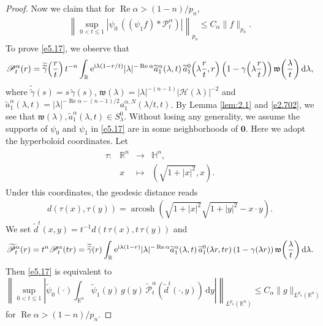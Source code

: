 \documentclass[11pt]{amsproc}
\newcommand{\R}{\mathbb{R}}
\newcommand{\e}{\mathrm{e}}
\newcommand{\arcosh}{\mathop{\mathrm{arcosh}}}
\newcommand{\0}{\mathbf{0}}
\newcommand{\bc}{{ \mathcal{H} }}
\newcommand{\fc}{\mathfrak{w}}
\renewcommand{\Re}{\mathop{\mathrm{Re}}}
\renewcommand{\H}{\mathbb{H}}
\renewcommand{\i}{\mathrm{i}}
\renewcommand{\d}{\mathrm{d}}
\numberwithin{equation}{section}
\numberwithin{figure}{section}
\theoremstyle{definition}
\theoremstyle{remark}
\numberwithin{thm}{section}
\begin{document}
\begin{proof}
Now we claim that for $ \Re\alpha>{(1-n)/p_n}$,
\begin{eqnarray}\label{e5.17}
\left\|\sup_{0<t\leq 1}|\psi_0\,((\psi_1f)*\mathscr{P}^\alpha_t)|\right\|_{p_n}\leq C_\alpha \|f\|_{p_n}.
\end{eqnarray}
To prove \eqref{e5.17}, we observe that 
\begin{eqnarray*}
\mathscr{P}^\alpha_t(r)=\widetilde{\widetilde{\gamma}}\!\left({r\over t}\right)t^{-n}\int_{\R}\e^{\i\lambda(1-r/t)}|\lambda|^{-\Re\alpha}\widetilde{a}^\alpha_1(\lambda,t)\,\widetilde{a}^0_1\!\left(\lambda {r\over t},r\right)\left(1-\gamma\!\left(\lambda {r\over t}\right)\right)\fc\!\left({\lambda\over t}\right)\d\lambda,
\end{eqnarray*}
where $\widetilde{\widetilde{\gamma}}(s)=s\,\widetilde{\gamma}(s)$,
$\fc(\lambda)=|\lambda|^{-(n-1)}|\bc(\lambda)|^{-2}$ and $\widetilde{a}^\alpha_1(\lambda,t)=|\lambda|^{-\Re\alpha-(n-1)/2}a^{\alpha,N}_1(\lambda/t, t)$.  By Lemma \ref{lem:2.1} and \eqref{e2.702}, we see that $\fc(\lambda),\widetilde{a}^\alpha_1(\lambda,t)\in S^0_\lambda$.
Without losing any generality, we assume the supports of $\psi_0$ and $\psi_1$ in \eqref{e5.17} are in some neighborhoods of $\0$. Here we adopt the hyperboloid coordinates. Let
\begin{eqnarray*}
\begin{array}{cccc}
\tau:&\R^n&\to&\H^n,\\
&x&\mapsto&(\sqrt{1+|x|^2},x).
\end{array}
\end{eqnarray*}
Under this coordinates, the geodesic distance reads
\begin{eqnarray*}
d(\tau(x),\tau(y))=\arcosh(\sqrt{1+|x|^2}\sqrt{1+|y|^2}-x\cdot y).
\end{eqnarray*}	
We set $\widetilde{d}^t(x,y)=t^{-1}d(t\,\tau(x),t\,\tau(y))$ and
\begin{eqnarray*}
\widetilde{\mathscr{P}}^\alpha_t(r)=t^{n}\mathscr{P}^\alpha_t(tr)=\widetilde{\widetilde{\gamma}}(r)\int_{\R}\e^{\i\lambda(1-r)}|\lambda|^{-\Re\alpha}\widetilde{a}^\alpha_1(\lambda,t)\,\widetilde{a}^0_1(\lambda r,tr)\,(1-\gamma(\lambda r))\,\fc\!\left({\lambda\over t}\right)\d\lambda.
\end{eqnarray*}
Then \eqref{e5.17} is equivalent to
\begin{equation}\label{e5.18}
\left\|\sup_{0<t\leq 1}\left|\widetilde{\psi}_0(\cdot)\int_{\R^n}\widetilde{\psi}_1(y)\,g(y)\,\widetilde{\mathscr{P}}^\alpha_t(\widetilde{d}^t(\cdot,y))\,\d y\right|\right\|_{L^{p_n}(\R^n)}\leq C_{\alpha}\|g\|_{L^{p_n}(\R^n)}
\end{equation}
for $ \Re\alpha>{(1-n)/p_n}.$


\end{proof}
\end{document}
